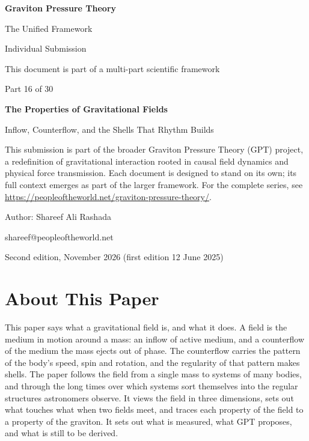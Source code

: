 \documentclass[11pt,a4paper]{article}
\begin{document}
\renewcommand{\thetable}{16.\arabic{table}}
\begin{titlepage}
\centering
\vspace*{1.5cm}
{\Huge\bfseries Graviton Pressure Theory\par}
\vspace{0.4cm}
{\Large The Unified Framework\par}
{\large Individual Submission\par}
\vspace{0.3cm}
{\normalsize This document is part of a multi-part scientific framework\par}
\vspace{1.6cm}
{\large Part 16 of 30\par}
\vspace{0.6cm}
{\huge\bfseries The Properties of Gravitational Fields\par}
\vspace{0.5cm}
{\Large Inflow, Counterflow, and the Shells That Rhythm Builds\par}
\vspace{1.4cm}
\begin{minipage}{0.82\textwidth}\centering\small
This submission is part of the broader Graviton Pressure Theory (GPT) project, a redefinition of gravitational interaction rooted in causal field dynamics and physical force transmission. Each document is designed to stand on its own; its full context emerges as part of the larger framework. For the complete series, see \url{https://peopleoftheworld.net/graviton-pressure-theory/}.
\end{minipage}
\vfill
{\large Author: Shareef Ali Rashada\par}
{\normalsize shareef@peopleoftheworld.net\par}
\vspace{0.3cm}
{\normalsize Second edition, November 2026 \quad (first edition 12 June 2025)\par}
\end{titlepage}

\tableofcontents
\newpage

\section*{About This Paper}

This paper says what a gravitational field is, and what it does. A field is the medium in motion around a mass: an inflow of active medium, and a counterflow of the medium the mass ejects out of phase. The counterflow carries the pattern of the body's speed, spin and rotation, and the regularity of that pattern makes shells. The paper follows the field from a single mass to systems of many bodies, and through the long times over which systems sort themselves into the regular structures astronomers observe. It views the field in three dimensions, sets out what touches what when two fields meet, and traces each property of the field to a property of the graviton. It sets out what is measured, what GPT proposes, and what is still to be derived.
\end{document}
